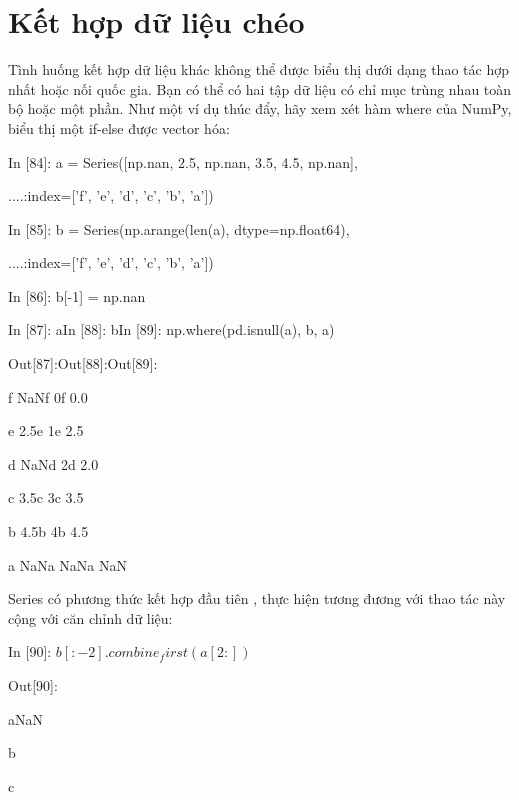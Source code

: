 \section{Kết hợp dữ liệu chéo}
\par\textup Tình huống kết hợp dữ liệu khác không thể được biểu thị dưới dạng thao tác hợp nhất hoặc nối quốc gia. Bạn có thể có hai tập dữ liệu có chỉ mục trùng nhau toàn bộ hoặc một phần. Như một ví dụ thúc đẩy, hãy xem xét hàm where của NumPy, biểu thị một if-else được vector hóa:
\par\quad\textup In [84]: a = Series([np.nan, 2.5, np.nan, 3.5, 4.5, np.nan],
\par\quad\quad\quad  ....:\quad\quad index=['f', 'e', 'd', 'c', 'b', 'a'])
\par\quad\textup In [85]: b = Series(np.arange(len(a), dtype=np.float64),
\par\quad\quad\quad ....:\quad\quad index=['f', 'e', 'd', 'c', 'b', 'a'])
\par\quad\textup In [86]: b[-1] = np.nan
\par\quad\textup In [87]: a\quad\quad\quad In [88]: b\quad\quad In [89]: np.where(pd.isnull(a), b, a)
\par\quad\textup Out[87]:\xspace\quad\quad\quad Out[88]:\quad\quad\quad Out[89]:
\par\quad\textup f NaN\xspace\xspace\xspace\quad\quad\quad\quad f 0\quad\quad\quad\quad\quad\xspace\quad f 0.0
\par\quad\textup e 2.5\quad\quad\quad\quad\quad e 1\quad\quad\quad\quad\quad\quad e 2.5
\par\quad\textup d NaN\xspace\xspace\quad\quad\quad\quad d 2\quad\quad\quad\quad\quad\quad d 2.0
\par\quad\textup c 3.5\quad\quad\quad\quad\quad c 3\quad\quad\quad\quad\quad\quad c 3.5
\par\quad\textup b 4.5\quad\quad\quad\quad\quad b 4\quad\quad\quad\quad\quad\quad b 4.5
\par\quad\textup a NaN\quad\quad\quad\quad a NaN\quad\quad\quad\quad\quad a NaN
\par\quad\textup Series có phương thức kết hợp đầu tiên , thực hiện tương đương với thao tác này cộng với căn chỉnh dữ liệu:
\par\quad\textup In [90]: $b[:-2].combine_first(a[2:])$
\par\quad\textup Out[90]:
\par\quad\textup a\quad NaN
\par\quad\textup b
\par\quad\textup c
